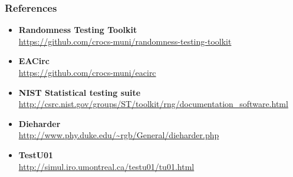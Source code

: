 \documentclass[aspectratio=169]{beamer}
\begin{document}
\begin{frame}

\frametitle{References}
\begin{itemize}
\item \textbf{Randomness Testing Toolkit} \\ \url{https://github.com/crocs-muni/randomness-testing-toolkit}
\item \textbf{EACirc} \\ \url{https://github.com/crocs-muni/eacirc}
\item \textbf{NIST Statistical testing suite} \\ \url{http://csrc.nist.gov/groups/ST/toolkit/rng/documentation_software.html}
\item \textbf{Dieharder} \\ \url{http://www.phy.duke.edu/~rgb/General/dieharder.php}
\item \textbf{TestU01} \\ \url{http://simul.iro.umontreal.ca/testu01/tu01.html}
\end{itemize}

\end{frame}
\end{document}
